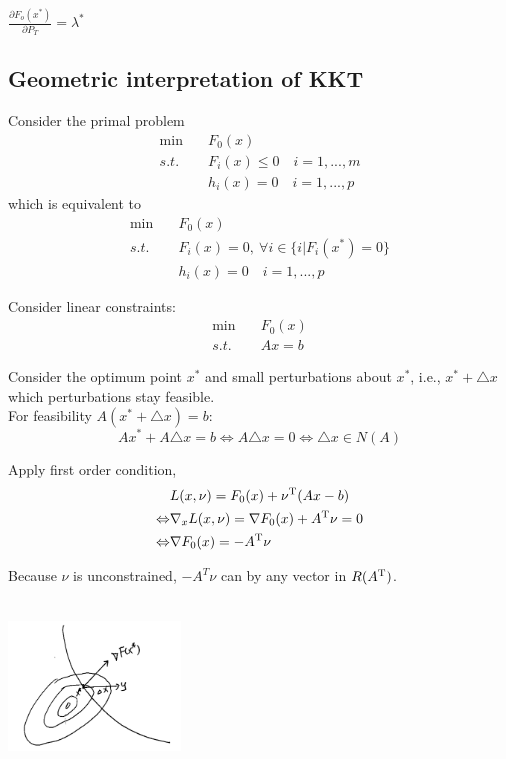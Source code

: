 $\frac{\partial F_o(x^*)}{\partial P_T} = \lambda^*$

\subsection{Geometric interpretation of KKT}
Consider the primal problem
\begin{align*}
\min \quad & F_0(x)\\
s.t. \quad & F_i(x)\leq 0\quad i=1,...,m\\
&h_i(x) = 0\quad i=1,...,p
\end{align*}
which is equivalent to 
\begin{align*}
\min \quad & F_0(x)\\
s.t. \quad & F_i(x)= 0,\ \forall i\in\{i | F_i(x^*)=0\}\\
&h_i(x) = 0\quad i=1,...,p
\end{align*}

Consider linear constraints:
\begin{align*}
\min \quad & F_0(x)\\
s.t. \quad & Ax = b
\end{align*}

Consider the optimum point $x^*$ and small perturbations about $x^*$, i.e., $x^*+\triangle x$ which perturbations stay feasible.\\

For feasibility $A(x^*+\triangle x) = b$:
$$Ax^* + A\triangle x = b\Leftrightarrow A\triangle x = 0\Leftrightarrow \triangle x \in N(A)$$

Apply first order condition,
\begin{align*}
&L(x,\nu) = F_0(x) +\nu^{{\rm T}}(Ax-b)\\
\Leftrightarrow & \nabla_xL(x,\nu) = \nabla F_0(x) + A^{{\rm T}}\nu  = 0\\
\Leftrightarrow & \nabla F_0(x) = -A^{{\rm T}}\nu
\end{align*}

Because $\nu$ is unconstrained, $-A^{T}\nu$ can by any vector in $R(A^{{\rm T}})$.



\begin{marginfigure}
	\centering
	\includegraphics[width=1.8in,height=1.8in]{figures/ch10/figure1204_3.png}
\end{marginfigure}

